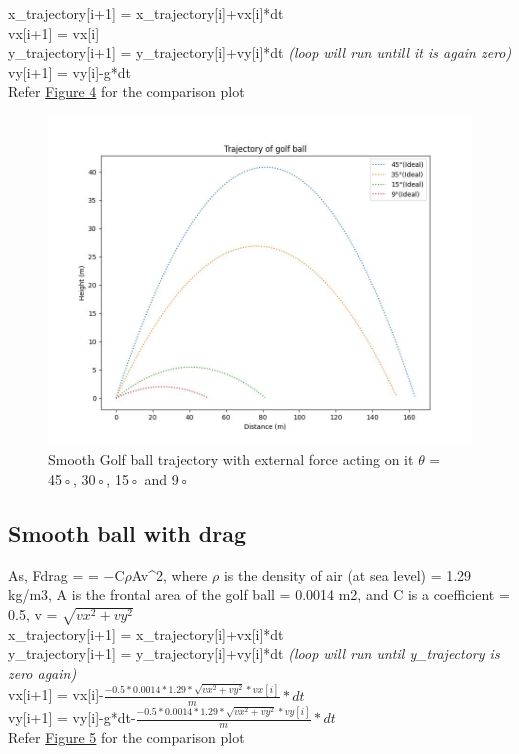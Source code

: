\documentclass[11pt]{article}
\begin{document}
\begin{raggedright}
\begin{justify}
x\_trajectory[i+1] = x\_trajectory[i]+vx[i]*dt\\
vx[i+1] = vx[i]\\
y\_trajectory[i+1] = y\_trajectory[i]+vy[i]*dt \textit{(loop will run untill it is again zero)}\\
vy[i+1] = vy[i]-g*dt\\
Refer \hyperref[fig:ideal_trajectory]{Figure 4} for the comparison plot

\end{justify}
\end{raggedright}

\begin{figure}[b]
    \centering
    \includegraphics[width=\textwidth, height=\textheight, keepaspectratio]{Golf_Trajectory_Ideal.jpeg}
    \caption{Smooth Golf ball trajectory with external force acting on it $\theta$ = 45◦, 30◦, 15◦ and 9◦}
    \label{fig:ideal_trajectory}
\end{figure}

\subsection{Smooth ball with drag}
As, Fdrag = = −C$\rho$Av^2, where $\rho$ is the density of air (at sea level) = 1.29 kg/m3, A is the frontal area of the golf ball = 0.0014 m2, and C is a coefficient = 0.5, v = $\sqrt{vx^2+vy^2}$\\
x\_trajectory[i+1] = x\_trajectory[i]+vx[i]*dt\\
y\_trajectory[i+1] = y\_trajectory[i]+vy[i]*dt \textit{(loop will run until y\_trajectory is zero again)}\\
vx[i+1] = vx[i]-$\frac{-0.5*0.0014*1.29*\sqrt{vx^2+vy^2}*vx[i]}{m}*dt$\\
vy[i+1] = vy[i]-g*dt-$\frac{-0.5*0.0014*1.29*\sqrt{vx^2+vy^2}*vy[i]}{m}*dt$\\
Refer \hyperref[fig:Smooth_Fdrag_trajectory]{Figure 5} for the comparison plot
\end{document}
